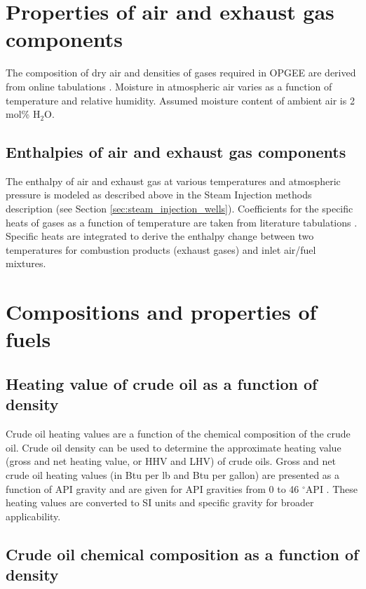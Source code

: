\documentclass[11pt]{report}
\begin{document}
\section{Properties of air and exhaust gas components}

The composition of dry air and densities of gases required in OPGEE are derived from online tabulations \cite{EngToolbox}. Moisture in atmospheric air varies as a function of temperature and relative humidity. Assumed moisture content of ambient air is 2 mol\% H$_2$O.

\subsection{Enthalpies of air and exhaust gas components}\label{sec:flue_gas_enthalpy}

The enthalpy of air and exhaust gas at various temperatures and atmospheric pressure is modeled as described above in the Steam Injection methods description (see Section \ref{sec:steam_injection_wells}).  Coefficients for the specific heats of gases as a function of temperature are taken from literature tabulations \cite[Table A2-E]{Cengel2006}. Specific heats are integrated to derive the enthalpy change between two temperatures for combustion products (exhaust gases) and inlet air/fuel mixtures.


\section{Compositions and properties of fuels}\label{sec:properties_fuels}


\subsection{Heating value of crude oil as a function of density}

Crude oil heating values are a function of the chemical composition of the crude oil. Crude oil density can be used to determine the approximate heating value (gross and net heating value, or HHV and LHV) of crude oils. Gross and net crude oil heating values (in Btu per lb and Btu per gallon) are presented as a function of API gravity and are given for API gravities from 0 to 46 $^\circ$API \cite[Table 11]{Schmidt1985}. These heating values are converted to SI units and specific gravity for broader applicability.

\subsection{Crude oil chemical composition as a function of density}
\end{document}
